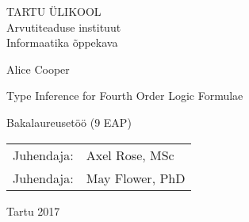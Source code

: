\documentclass[../thesis.tex]{subfiles}
\begin{document}
\thispagestyle{empty}
\begin{center}

\large
TARTU ÜLIKOOL\\
Arvutiteaduse instituut\\
Informaatika õppekava\\%

\vspace{25mm}

\Large Alice Cooper

\vspace{4mm}

\huge Type Inference for Fourth Order Logic Formulae 

\vspace{20mm}

\Large Bakalaureusetöö (9 EAP)

\end{center}

\vspace{2mm}

\begin{flushright}
 {
 \setlength{\extrarowheight}{5pt}
 \begin{tabular}{r l} 
  \sffamily Juhendaja: & \sffamily Axel Rose, MSc \\
  \sffamily Juhendaja: & \sffamily May Flower, PhD
 \end{tabular}
 }
\end{flushright}


\vfill
\centerline{Tartu 2017}
\end{document}

